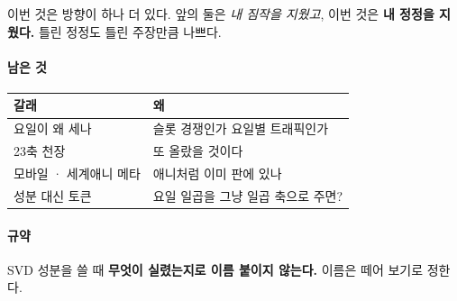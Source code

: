 \documentclass[10pt]{article}
\begin{document}
이번 것은 방향이 하나 더 있다. 앞의 둘은 \emph{내 짐작을 지웠고}, 이번 것은
\textbf{내 정정을 지웠다.} 틀린 정정도 틀린 주장만큼 나쁘다.

\paragraph{남은 것}
\begin{center}\small
\begin{tabular}{ll}
\hline
갈래 & 왜 \\
\hline
요일이 왜 세나 & 슬롯 경쟁인가 요일별 트래픽인가 \\
23축 천장 & 또 올랐을 것이다 \\
모바일 · 세계애니 메타 & 애니처럼 이미 판에 있나 \\
성분 대신 토큰 & 요일 일곱을 그냥 일곱 축으로 주면? \\
\hline
\end{tabular}
\end{center}

\paragraph{규약} SVD 성분을 쓸 때 \textbf{무엇이 실렸는지로 이름 붙이지
않는다.} 이름은 떼어 보기로 정한다.
\end{document}
